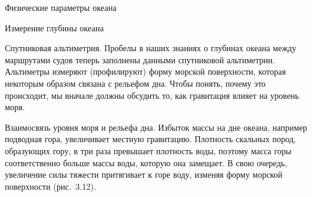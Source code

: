 \begin{chapter}{Физические параметры океана}
\begin{section}{Измерение глубины океана}
\begin{paragraph}{Спутниковая альтиметрия.}
Пробелы в наших знаниях о глубинах океана между маршрутами судов
теперь заполнены данными спутниковой альтиметрии. Альтиметры измеряют
(профилируют) форму морской поверхности, которая некоторым образом 
связана с рельефом дна. Чтобы понять, почему это
происходит, мы вначале должны обсудить то, как гравитация влияет на
уровень моря.
%

\begin{subparagraph}{Взаимосвязь уровня моря и рельефа дна.}
Избыток массы на дне океана, например подводная гора, увеличивает местную
гравитацию. Плотность скальных пород, образующих гору, в три раза превышает
плотность воды, поэтому масса горы соответственно больше массы воды, 
которую она замещает. В свою очередь, увеличение силы тяжести притягивает 
к горе воду, изменяя форму морской поверхности (рис.~3.12).
%


\end{subparagraph}
\end{paragraph}
\end{section}
\end{chapter}
